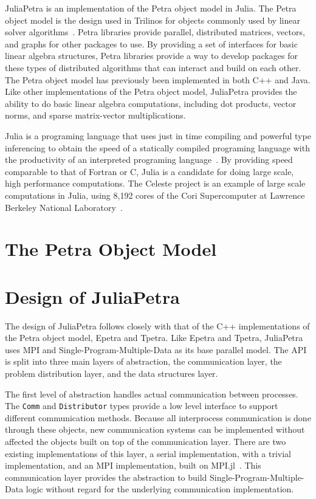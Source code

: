\documentclass[acmsmall]{acmart}
\newcommand{\snippet}[1]{\lstinline{#1}}
\begin{document}
	JuliaPetra is an implementation of the Petra object model in Julia.
	The Petra object model is the design used in Trilinos for objects commonly used by linear solver algorithms~\cite{Heroux:2005:Trilinos}.
	Petra libraries provide parallel, distributed matrices, vectors, and graphs for other packages to use.
	By providing a set of interfaces for basic linear algebra structures, Petra libraries provide a way
	to develop packages for these types of distributed algorithms that can interact and build on each other.
	The Petra object model has previously been implemented in both C++ and Java.
	Like other implementations of the Petra object model, JuliaPetra provides the ability to do basic linear algebra computations, including dot products, vector norms, and sparse matrix-vector multiplications.
	
	Julia is a programing language that uses just in time compiling and powerful type inferencing
	to obtain the speed of a statically compiled programing language with the productivity of an
	interpreted programing language~\cite{Bezanson:2017:FreshApproach}.
	By providing speed comparable to that of Fortran or C, Julia is a candidate for doing large scale,
	high performance computations.
	The Celeste project is an example of large scale computations in Julia,
	using 8,192 cores of the Cori Supercomputer
	at Lawrence Berkeley National Laboratory~\cite{Bezanson:2017:FreshApproach}.
	
	\section{The Petra Object Model}
	
	
	\section{Design of JuliaPetra}
	
	The design of JuliaPetra follows closely with that of the C++ implementations of the
	Petra object model, Epetra and Tpetra.
	Like Epetra and Tpetra, JuliaPetra uses MPI and Single-Program-Multiple-Data as its base parallel model.
	The API is split into three main layers of abstraction, the communication layer, the problem distribution layer, and the data structures layer.
	
	The first level of abstraction handles actual communication between processes.
	The \snippet{Comm} and \snippet{Distributor} types provide a low level interface to support different communication methods.
	Because all interprocess communication is done through these objects, new communication systems can be implemented without affected the objects built on top of the communication layer.
	There are two existing implementations of this layer, a serial implementation, with a trivial implementation, and an MPI implementation, built on MPI.jl~\cite{Github:MPI}.
	This communication layer provides the abstraction to build Single-Program-Multiple-Data logic without regard for the underlying communication implementation.
	
\end{document}
